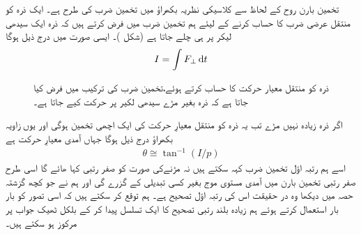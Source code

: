 تخمین بارن روح کے لحاظ سے کلاسیکی نظریہ بکھراؤ میں تخمین ضرب کی طرح ہے۔ ایک ذرہ کو منتقل عرضی ضرب کا حساب کرنے کے لیئے ہم تخمین ضرب میں فرض کرتے ہیں
 کہ ذرہ ایک سیدھی لیکر پر ہی چلے جاتا ہے  (شکل )۔  ایسی صورت میں درج ذیل ہوگا
\begin{align}
	I=\int F_\perp\dif t
\end{align}
%
\begin{figure}
\centering
{}
\caption{ ذرہ  کو منتقل معیار حرکت کا حساب کرتے ہوئے،تخمین ضرب کی ترکیب  میں فرض کیا  جاتا ہے کہ ذرہ بغیر  مڑے سیدھی لکیر پر حرکت کیے جاتا ہے۔}
\label{شکل_بکھراو_تخمین_ضرب}
\end{figure}

اگر ذرہ زیادہ نہیں مڑے تب یہ ذرہ کو منتقل معیارِ حرکت کی ایک اچھی تخمین ہوگی اور یوں زاویہ بکھراؤ درج ذیل ہوگا جہاں  آمدی معیارِ حرکت ہے 
\begin{align}
	\theta\cong\tan^{-1}(I/p)
\end{align}
اسے ہم رتبہ اوّل تخمین ضرب کہہ سکتے ہیں نہ مڑنےکی صورت کو صفر رتبی کہا ھائے گا اسی طرح صفر رتبی تخمین بارن میں آمدی مستوی موج بغیر کسی تبدیلی کے گزرے گی اور ہم نے جو کچھ گزشتہ حصہ میں دیکھا وہ در حقیقت اس کی رتبہ اوّل تصحیح ہے۔ ہم توقع کر سکتے ہیں کہ اسی تصور کو بار بار استعمال کرتے ہوئے ہم زیادہ بلند رتبی تصحیح کا ایک تسلسل پیدا کر کے بلکل ٹھیک جواب پر مرکوز ہو سکتے ہیں۔


